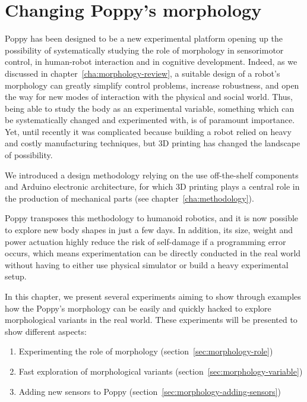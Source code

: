 
\cleartoleftpage



\chapter{Changing Poppy's morphology} %
\label{cha:changing_morphology}


Poppy has been designed to be a new experimental platform opening up the possibility of systematically studying the role of morphology in sensorimotor control, in human-robot interaction and in cognitive development. Indeed, as we discussed in chapter~\ref{cha:morphology-review}, a suitable design of a robot’s morphology can greatly simplify control problems, increase robustness, and open the way for new modes of interaction with the physical and social world. Thus, being able to study the body as an experimental variable, something which can be systematically changed and experimented with, is of paramount importance. Yet, until recently it was complicated because building a robot relied on heavy and costly manufacturing techniques, but 3D printing has changed the landscape of possibility.

We introduced a design methodology relying on the use off-the-shelf components and Arduino electronic architecture, for which 3D printing plays a central role in the production of mechanical parts (see chapter~\ref{cha:methodology}).

Poppy transposes this methodology to humanoid robotics, and it is now possible to explore new body shapes in just a few days. In addition, its size, weight and power actuation highly reduce the risk of self-damage if a programming error occurs, which means experimentation can be directly conducted in the real world without having to either use physical simulator or build a heavy experimental setup.

In this chapter, we present several experiments aiming to show through examples how the Poppy's morphology can be easily and quickly hacked  to explore morphological variants in the real world.
These experiments will be presented to show different aspects:

\begin{enumerate}
    \item Experimenting the role of morphology (section~\ref{sec:morphology-role})
    \item Fast exploration of morphological variants (section~\ref{sec:morphology-variable})
    \item Adding new sensors to Poppy (section~\ref{sec:morphology-adding-sensors})
\end{enumerate}




